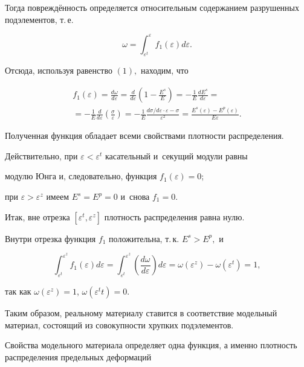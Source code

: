 Тогда повреждённость определяется относительным содержанием разрушенных подэлементов, т.\,е.

$$

\omega=\int_{\varepsilon^t}^{\varepsilon} f_1(\varepsilon) d \varepsilon.

$$

Отсюда, используя равенство $\left(1\right),$ находим, что

\begin{multline*}

f_1(\varepsilon)=\frac{d \omega}{d \varepsilon}=\frac{d }{d \varepsilon} \left(1-\frac{E^s}{E}\right)=-\frac{1}{E} \frac{d E^s}{d \varepsilon}=

\\

=

-\frac{1}{E} \frac{d}{d \varepsilon} \left(\frac{\sigma}{\varepsilon}\right)=-\frac{1}{E} \frac{d \sigma/d\varepsilon \cdot \varepsilon-\sigma}{\varepsilon^2}=

\frac{E^s(\varepsilon)-E^p(\varepsilon)}{E\varepsilon}. \tag{2}

\end{multline*}

Полученная функция обладает всеми свойствами плотности распределения.

Действительно, при $\varepsilon<\varepsilon^t$ касательный и~секущий модули равны

модулю Юнга и, следовательно, функция $f_1(\varepsilon)=0$;

при $\varepsilon>\varepsilon^z$ имеем $E^s=E^p=0$ и~снова $f_1=0.$

Итак, вне отрезка $[\varepsilon^t, \varepsilon^z]$ плотность распределения равна нулю.

Внутри отрезка функция $f_1$ положительна, т.\,к. $E^s>E^p,$ и

$$

\int_{\varepsilon^t}^{\varepsilon^z} f_1(\varepsilon) d \varepsilon=\int_{\varepsilon^t}^{\varepsilon^z} \left(\frac{d\omega}{d\varepsilon}\right) d \varepsilon=\omega(\varepsilon^z)-\omega(\varepsilon^t)=1,

$$

так как $\omega(\varepsilon^z)=1$, $\omega(\varepsilon^tt)=0.$



Таким образом, реальному материалу ставится в соответствие модельный материал, состоящий из совокупности хрупких подэлементов.

Свойства модельного материала определяет одна функция, а именно плотность распределения предельных деформаций

